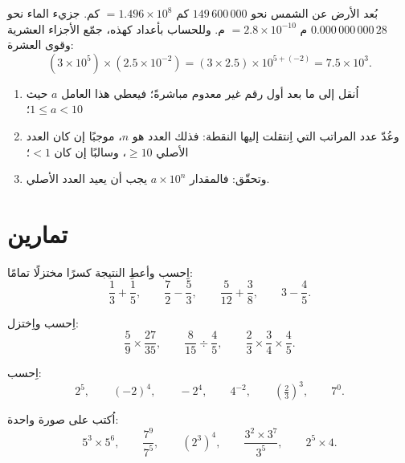 \begin{example}\label{ex:g9:fractions:scientific}
بُعد الأرض عن الشمس نحو $149\,600\,000$ كم $= 1.496 \times
10^8$ كم.  جزيء الماء نحو $0.000\,000\,000\,28$ م
$= 2.8 \times 10^{-10}$ م. وللحساب بأعداد كهذه، جمّع
الأجزاء العشرية وقوى العشرة:
\[
(3 \times 10^5) \times (2.5 \times 10^{-2})
= (3 \times 2.5) \times 10^{5 + (-2)}
= 7.5 \times 10^{3}.
\]
\end{example}

\begin{method}\label{met:g9:fractions:scientific}
\begin{enumerate}
  \item اُنقل  إلى ما بعد أول رقم غير معدوم مباشرةً؛ فيعطي
        هذا العامل $a$ حيث $1 \leq a < 10$؛
  \item وعُدّ عدد المراتب التي اِنتقلت إليها النقطة: فذلك العدد هو $n$،
        موجبًا إن كان العدد الأصلي $\geq 10$، وسالبًا إن كان
        $< 1$؛
  \item وتحقّق: فالمقدار $a \times 10^n$ يجب أن يعيد العدد الأصلي.
\end{enumerate}
\end{method}

\section{تمارين}

\begin{exercise}[$\star$]\label{exo:g9:fractions:1}
اِحسب وأعطِ النتيجة كسرًا مختزلًا تمامًا:
\[
\frac13 + \frac15, \qquad
\frac72 - \frac53, \qquad
\frac{5}{12} + \frac38, \qquad
3 - \frac45 .
\]
\end{exercise}

\begin{exercise}[$\star$]\label{exo:g9:fractions:2}
اِحسب واِختزل:
\[
\frac59 \times \frac{27}{35}, \qquad
\frac{8}{15} \div \frac{4}{5}, \qquad
\frac23 \times \frac34 \times \frac45 .
\]
\end{exercise}

\begin{exercise}[$\star$]\label{exo:g9:fractions:3}
اِحسب:
\[
2^5, \qquad (-2)^4, \qquad -2^4, \qquad 4^{-2}, \qquad
\left(\tfrac23\right)^3, \qquad 7^0 .
\]
\end{exercise}

\begin{exercise}[$\star$]\label{exo:g9:fractions:4}
اُكتب على صورة  واحدة:
\[
5^3 \times 5^6, \qquad
\frac{7^9}{7^5}, \qquad
\left(2^3\right)^4, \qquad
\frac{3^2 \times 3^7}{3^5}, \qquad
2^5 \times 4 .
\]
\end{exercise}

